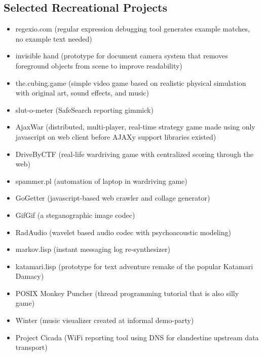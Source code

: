 \documentclass[12pt]{article}
\begin{document}
\subsection*{Selected Recreational Projects}
\begin{itemize}
  \item regexio.com (regular expression debugging tool generates example matches, no example text needed)
  \item invisible hand (prototype for document camera system that removes foreground objects from scene to improve readability)
  \item the.cubing.game (simple video game based on realistic physical simulation with original art, sound effects, and music)
  \item slut-o-meter (SafeSearch reporting gimmick)
  \item AjaxWar (distributed, multi-player,  real-time strategy game made using only javascript on web client before AJAXy support libraries existed)
  \item DriveByCTF (real-life wardriving game with centralized scoring through the web)
  \item spammer.pl (automation of laptop in wardriving game)
  \item GoGetter (javascript-based web crawler and collage generator)
  \item GifGif (a steganographic image codec)
  \item RadAudio (wavelet based audio codec with psychoacoustic modeling)
  \item markov.lisp (instant messaging log re-synthesizer)
  \item katamari.lisp (prototype for text adventure remake of the popular Katamari Damacy)
  \item POSIX Monkey Puncher (thread programming tutorial that is also silly game)
  \item Winter (music visualizer created at informal demo-party)
  \item Project Cicada (WiFi reporting tool using DNS for clandestine upstream data transport)
\end{itemize}

\newpage
\end{document}
